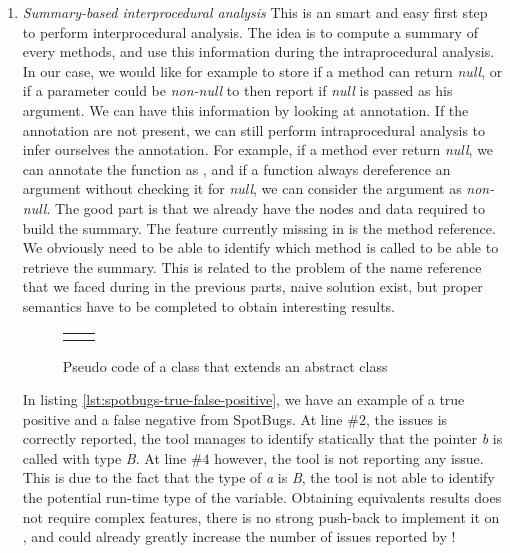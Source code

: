 \begin{enumerate}
	\item \textit{Summary-based interprocedural analysis} \newline
	This is an smart and easy first step to perform interprocedural analysis.
	The idea is to compute a summary of every methods, and use this information during the intraprocedural analysis. 
	In our case, we would like for example to store if a method can return \emph{null}, or if a parameter could be \emph{non-null} to then report if \emph{null} is passed as his argument. 
	We can have this information by looking at annotation.
	If the annotation are not present, we can still perform intraprocedural analysis to infer ourselves the annotation. 
	For example, if a method ever return \emph{null}, we can annotate the function as \nullable{}, and if a function always dereference an argument without checking it for \emph{null}, we can consider the argument as \emph{non-null}. 
	The good part is that we already have the nodes and data required to build the summary. 
	The feature currently missing in \slang{} is the method reference. 
	We obviously need to be able to identify which method is called to be able to retrieve the summary.
	This is related to the problem of the name reference that we faced during in the previous parts, naive solution exist, but proper semantics have to be completed to obtain interesting results.
	
	
	\begin{figure}[h]
		\centering
		\caption{Pseudo code of a class that extends an abstract class}
		\label{figure:class-extends-abtract}
		\setlength{\tabcolsep}{24pt}
		\begin{tabular}{cc}
			\multicolumn{1}{c}{} & \multicolumn{1}{c}{} \\
		\end{tabular}
	\end{figure}
	
	
	
	In listing \ref{lst:spotbugs-true-false-positive}, we have an example of a true positive and a false negative from SpotBugs. At line $\#2$, the issues is correctly reported, the tool manages to identify statically that the pointer \emph{b} is called with type \emph{B}. At line $\#4$ however, the tool is not reporting any issue. This is due to the fact that the type of \emph{a} is \emph{B}, the tool is not able to identify the potential run-time type of the variable.\newline
	Obtaining equivalents results does not require complex features, there is no strong push-back to implement it on \slang{}, and could already greatly increase the number of issues reported by \slang{}!
\end{enumerate}